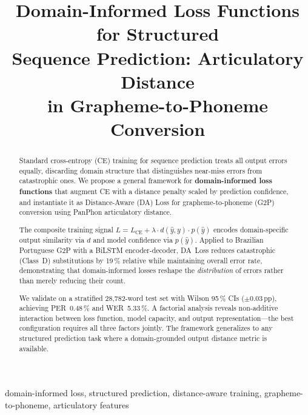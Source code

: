 \documentclass[conference]{IEEEtran}
\newcommand{\LCE}{L_{\mathrm{CE}}}        %
\newcommand{\lam}{\lambda}                %
\begin{document}

\title{Domain-Informed Loss Functions for Structured\\
       Sequence Prediction: Articulatory Distance\\
       in Grapheme-to-Phoneme Conversion}

\author{%
  \IEEEauthorblockN{[ANONYMOUS]}
  \IEEEauthorblockA{[ANONYMOUS]}
}

\maketitle

\begin{abstract}
Standard cross-entropy (CE) training for sequence prediction treats
all output errors equally, discarding domain structure that
distinguishes near-miss errors from catastrophic ones.
We propose a general framework for \textbf{domain-informed loss
functions} that augment CE with a distance penalty scaled by
prediction confidence, and instantiate it as Distance-Aware (DA)
Loss for grapheme-to-phoneme (G2P) conversion using PanPhon
articulatory distance.

The composite training signal
$L = \LCE + \lam \cdot d(\hat{y}, y) \cdot p(\hat{y})$
encodes domain-specific output similarity via $d$ and model
confidence via $p(\hat{y})$.
Applied to Brazilian Portuguese G2P with a BiLSTM encoder-decoder,
DA~Loss reduces catastrophic (Class~D) substitutions by 19\,\%
relative while maintaining overall error rate, demonstrating that
domain-informed losses reshape the \emph{distribution} of errors
rather than merely reducing their count.

We validate on a stratified 28{,}782-word test set with Wilson
95\,\% CIs ($\pm$0.03\,pp), achieving PER~0.48\,\% and
WER~5.33\,\%.
A factorial analysis reveals non-additive interaction between loss
function, model capacity, and output representation---the best
configuration requires all three factors jointly.
The framework generalizes to any structured prediction task where
a domain-grounded output distance metric is available.
\end{abstract}

\begin{IEEEkeywords}
domain-informed loss, structured prediction, distance-aware
training, grapheme-to-phoneme, articulatory features
\end{IEEEkeywords}
\end{document}
